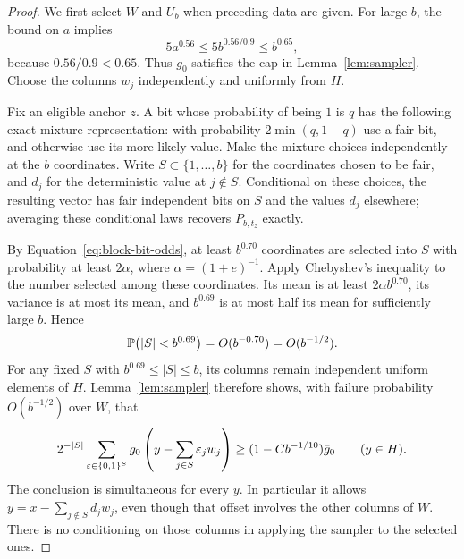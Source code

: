 \begin{proof}
We first select $W$ and $U_b$ when preceding data are given.
For large $b$, the bound on $a$ implies
\[
 5a^{0.56}\le5b^{0.56/0.9}\le b^{0.65},
\]
because $0.56/0.9<0.65$.  Thus $g_0$ satisfies the cap in
Lemma~\ref{lem:sampler}.  Choose the columns $w_j$ independently and
uniformly from $H$.

Fix an eligible anchor $z$.  A bit whose probability of being $1$ is $q$
has the following exact mixture representation: with probability
$2\min(q,1-q)$ use a fair bit, and otherwise use its more likely value.
Make the mixture choices independently at the $b$ coordinates.  Write
$S\subset\{1,\ldots,b\}$ for the coordinates chosen to be fair, and
$d_j$ for the deterministic value at $j\notin S$.
Conditional on these choices, the resulting vector has fair independent
bits on $S$ and the values $d_j$ elsewhere; averaging these conditional
laws recovers $P_{b,t_z}$ exactly.

By Equation~\eqref{eq:block-bit-odds}, at least $b^{0.70}$ coordinates
are selected into $S$ with probability at least $2\alpha$, where
$\alpha=(1+e)^{-1}$.  Apply Chebyshev's inequality to the number selected
among these coordinates.  Its mean is at least $2\alpha b^{0.70}$,
its variance is at most its mean, and $b^{0.69}$ is at most half its mean
for sufficiently large $b$.  Hence
\begin{equation}
 \mathbb P\bigl(|S|<b^{0.69}\bigr)=O(b^{-0.70})=O(b^{-1/2}).
 \label{eq:block-fair-count}
\end{equation}
For any fixed $S$ with $b^{0.69}\le|S|\le b$, its columns remain
independent uniform elements of $H$.  Lemma~\ref{lem:sampler} therefore
shows, with failure probability $O(b^{-1/2})$ over $W$, that
\[
 2^{-|S|}\sum_{\varepsilon\in\{0,1\}^S}
      g_0\left(y-\sum_{j\in S}\varepsilon_jw_j\right)
       \ge(1-Cb^{-1/10})\bar g_0\qquad(y\in H).
\]
The conclusion is simultaneous for every $y$.  In particular it allows
$y=x-\sum_{j\notin S}d_jw_j$, even though that offset involves the other
columns of $W$.  There is no conditioning on those columns in applying
the sampler to the selected ones.


\end{proof}
